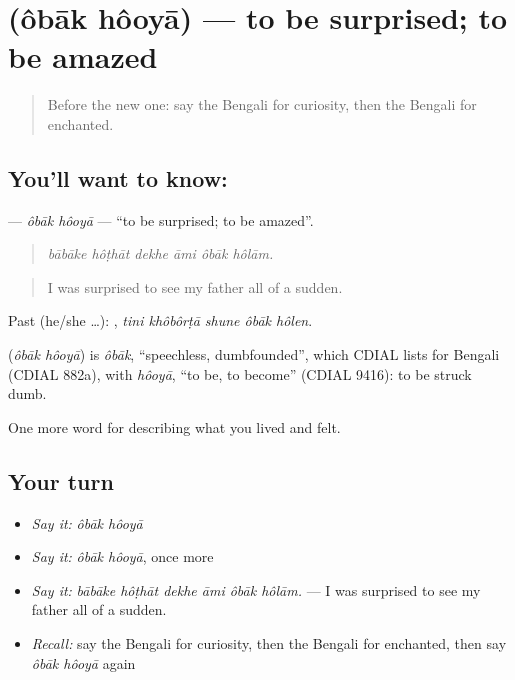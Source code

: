 \section[\texorpdfstring{\bn{অবাক} \bn{হওয়া} (ôbāk hôoyā)}{অবাক হওয়া (ôbāk hôoyā)}]{  (ôbāk hôoyā) — to be surprised; to be amazed}

\label{lesson:BN-C440-obak-hooya}



\begin{quote}
Before the new one: say the Bengali for curiosity, then the Bengali for enchanted.
\end{quote}

\subsection*{You'll want to know:  }
\textbf{ } — \emph{ôbāk hôoyā} — \textquotedblleft{}to be surprised; to be amazed\textquotedblright{}.

\begin{quote}
     
\end{quote}

\begin{quote}
\emph{bābāke hôṭhāt dekhe āmi ôbāk hôlām.}
\end{quote}

\begin{quote}
I was surprised to see my father all of a sudden.
\end{quote}

Past (he/she …):     , \emph{tini khôbôrṭā shune ôbāk hôlen}.

\begin{cousinweb}
\textbf{ } (\emph{ôbāk hôoyā}) is \emph{ôbāk}, \textquotedblleft{}speechless, dumbfounded\textquotedblright{}, which CDIAL lists for Bengali (CDIAL 882a), with \emph{hôoyā}, \textquotedblleft{}to be, to become\textquotedblright{} (CDIAL 9416): to be struck dumb.
\end{cousinweb}

\begin{grammarlens}[title={What you've built}]
One more word for describing what you lived and felt.
\end{grammarlens}

\subsection*{Your turn}
\begin{itemize}
\raggedright
  \item \emph{Say it:} \emph{ôbāk hôoyā}
  \item \emph{Say it:} \emph{ôbāk hôoyā}, once more
  \item \emph{Say it:} \emph{bābāke hôṭhāt dekhe āmi ôbāk hôlām.} — I was surprised to see my father all of a sudden.
  \item \emph{Recall:} say the Bengali for curiosity, then the Bengali for enchanted, then say \emph{ôbāk hôoyā} again
\end{itemize}

